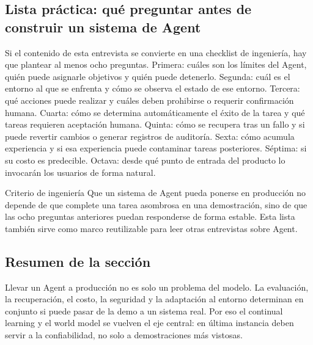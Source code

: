 \subsection{Lista práctica: qué preguntar antes de construir un sistema de Agent}

Si el contenido de esta entrevista se convierte en una checklist de ingeniería, hay que plantear al menos ocho preguntas. Primera: cuáles son los límites del Agent, quién puede asignarle objetivos y quién puede detenerlo. Segunda: cuál es el entorno al que se enfrenta y cómo se observa el estado de ese entorno. Tercera: qué acciones puede realizar y cuáles deben prohibirse o requerir confirmación humana. Cuarta: cómo se determina automáticamente el éxito de la tarea y qué tareas requieren aceptación humana. Quinta: cómo se recupera tras un fallo y si puede revertir cambios o generar registros de auditoría. Sexta: cómo acumula experiencia y si esa experiencia puede contaminar tareas posteriores. Séptima: si su costo es predecible. Octava: desde qué punto de entrada del producto lo invocarán los usuarios de forma natural.

\begin{importantbox}{Criterio de ingeniería}
Que un sistema de Agent pueda ponerse en producción no depende de que complete una tarea asombrosa en una demostración, sino de que las ocho preguntas anteriores puedan responderse de forma estable. Esta lista también sirve como marco reutilizable para leer otras entrevistas sobre Agent.
\end{importantbox}

\subsection{Resumen de la sección}

Llevar un Agent a producción no es solo un problema del modelo. La evaluación, la recuperación, el costo, la seguridad y la adaptación al entorno determinan en conjunto si puede pasar de la demo a un sistema real. Por eso el continual learning y el world model se vuelven el eje central: en última instancia deben servir a la confiabilidad, no solo a demostraciones más vistosas.
